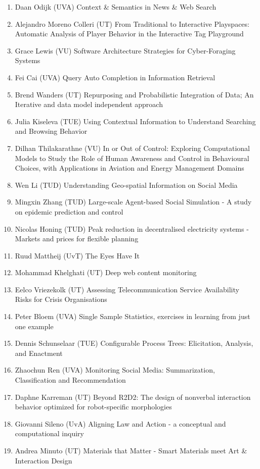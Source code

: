 \begin{multicols}{2}
\begin{scriptsize}
\begin{enumerate}[leftmargin=*,noitemsep,topsep=0pt,parsep=1pt,partopsep=0pt]
\item Daan Odijk (UVA) Context \& Semantics in News \& Web Search
\item Alejandro Moreno Colleri (UT) From Traditional to Interactive Playspaces: Automatic Analysis of Player Behavior in the Interactive Tag Playground
\item Grace Lewis (VU) Software Architecture Strategies for Cyber-Foraging Systems
\item Fei Cai (UVA) Query Auto Completion in Information Retrieval
\item Brend Wanders (UT) Repurposing and Probabilistic Integration of Data; An Iterative and data model independent approach
\item Julia Kiseleva (TUE) Using Contextual Information to Understand Searching and Browsing Behavior
\item Dilhan Thilakarathne (VU) In or Out of Control: Exploring Computational Models to Study the Role of Human Awareness and Control in Behavioural Choices, with Applications in Aviation and Energy Management Domains
\item Wen Li (TUD) Understanding Geo-spatial Information on Social Media
\item Mingxin Zhang (TUD) Large-scale Agent-based Social Simulation - A study on epidemic prediction and control
\item Nicolas Honing (TUD) Peak reduction in decentralised electricity systems -Markets and prices for flexible planning
\item Ruud Mattheij (UvT) The Eyes Have It
\item Mohammad Khelghati (UT) Deep web content monitoring
\item Eelco Vriezekolk (UT) Assessing Telecommunication Service Availability Risks for Crisis Organisations
\item Peter Bloem (UVA) Single Sample Statistics, exercises in learning from just one example
\item Dennis Schunselaar (TUE) Configurable Process Trees: Elicitation, Analysis, and Enactment
\item Zhaochun Ren (UVA) Monitoring Social Media: Summarization, Classification and Recommendation
\item Daphne Karreman (UT) Beyond R2D2: The design of nonverbal interaction behavior optimized for robot-specific morphologies
\item Giovanni Sileno (UvA) Aligning Law and Action - a conceptual and computational inquiry 
\item Andrea Minuto (UT) Materials that Matter - Smart Materials meet Art \& Interaction Design

\end{enumerate}
\end{scriptsize}
\end{multicols}
